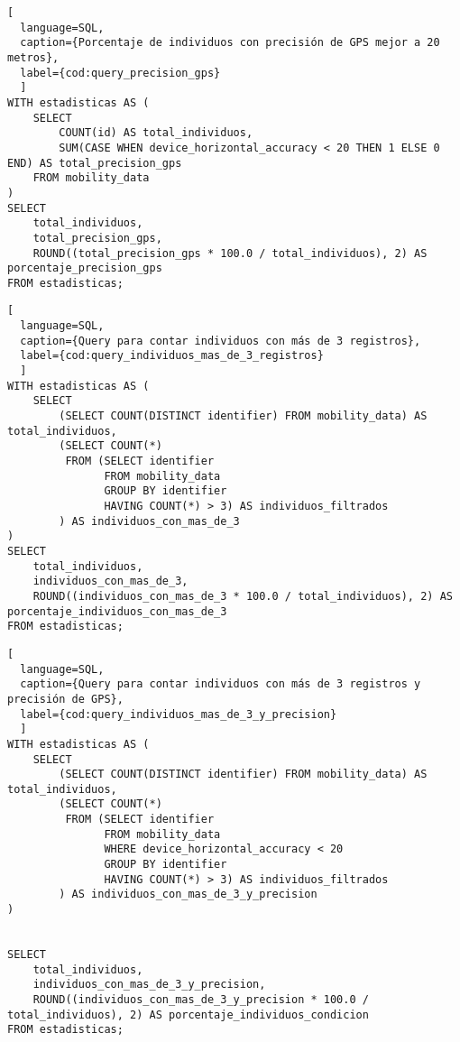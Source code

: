 \begin{lstlisting}[
  language=SQL,
  caption={Porcentaje de individuos con precisión de GPS mejor a 20 metros},
  label={cod:query_precision_gps}
  ]
WITH estadisticas AS (
    SELECT 
        COUNT(id) AS total_individuos,
        SUM(CASE WHEN device_horizontal_accuracy < 20 THEN 1 ELSE 0 END) AS total_precision_gps
    FROM mobility_data
)
SELECT 
    total_individuos,
    total_precision_gps,
    ROUND((total_precision_gps * 100.0 / total_individuos), 2) AS porcentaje_precision_gps
FROM estadisticas;
\end{lstlisting}

\begin{lstlisting}[
  language=SQL,
  caption={Query para contar individuos con más de 3 registros},
  label={cod:query_individuos_mas_de_3_registros}
  ]
WITH estadisticas AS (
    SELECT 
        (SELECT COUNT(DISTINCT identifier) FROM mobility_data) AS total_individuos,
        (SELECT COUNT(*) 
         FROM (SELECT identifier 
               FROM mobility_data 
               GROUP BY identifier 
               HAVING COUNT(*) > 3) AS individuos_filtrados
        ) AS individuos_con_mas_de_3
)
SELECT 
    total_individuos,
    individuos_con_mas_de_3,
    ROUND((individuos_con_mas_de_3 * 100.0 / total_individuos), 2) AS porcentaje_individuos_con_mas_de_3
FROM estadisticas;
\end{lstlisting}

\begin{lstlisting}[
  language=SQL,
  caption={Query para contar individuos con más de 3 registros y precisión de GPS},
  label={cod:query_individuos_mas_de_3_y_precision}
  ]
WITH estadisticas AS (
    SELECT 
        (SELECT COUNT(DISTINCT identifier) FROM mobility_data) AS total_individuos,
        (SELECT COUNT(*) 
         FROM (SELECT identifier 
               FROM mobility_data 
               WHERE device_horizontal_accuracy < 20
               GROUP BY identifier 
               HAVING COUNT(*) > 3) AS individuos_filtrados
        ) AS individuos_con_mas_de_3_y_precision
)


SELECT 
    total_individuos,
    individuos_con_mas_de_3_y_precision,
    ROUND((individuos_con_mas_de_3_y_precision * 100.0 / total_individuos), 2) AS porcentaje_individuos_condicion
FROM estadisticas;
\end{lstlisting}

